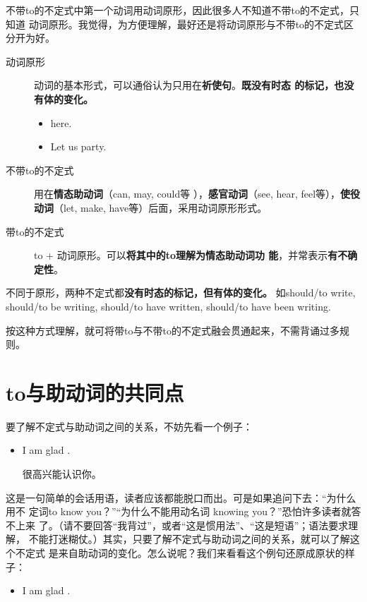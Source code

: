 不带to的不定式中第一个动词用动词原形，因此很多人不知道不带to的不定式，只知道
动词原形。我觉得，为方便理解，最好还是将动词原形与不带to的不定式区分开为好。

\begin{description}
\item[动词原形] 动词的基本形式，可以通俗认为只用在\textbf{祈使句}。\textbf{既没有时态
  的标记，也没有体的变化。}
  \begin{itemize}
  \item {} here.

  \item Let us party.
  \end{itemize}

\item[不带to的不定式] 用在\textbf{情态助动词}（can, may, could等
  ），\textbf{感官动词}（see, hear, feel等），\textbf{使役动词}（let, make,
  have等）后面，采用动词原形形式。

\item[带to的不定式] to + 动词原形。可以\textbf{将其中的to理解为情态助动词功
    能}，并常表示\textbf{有不确定性}。
\end{description}

不同于原形，两种不定式都\textbf{没有时态的标记，但有体的变化。} 如should/to write,
should/to be writing, should/to have written, should/to have been writing.

按这种方式理解，就可将带to与不带to的不定式融会贯通起来，不需背诵过多规则。

\section{to与助动词的共同点}

要了解不定式与助动词之间的关系，不妨先看一个例子：

\begin{itemize}
\item  I am glad .

  很高兴能认识你。
\end{itemize}

这是一句简单的会话用语，读者应该都能脱口而出。可是如果追问下去：“为什么用不
定词to know you？”“为什么不能用动名词 knowing you？”恐怕许多读者就答不上来
了。（请不要回答“我背过”，或者“这是惯用法”、“这是短语”；语法要求理解，
不能打迷糊仗。）其实，只要了解不定式与助动词之间的关系，就可以了解这个不定式
是来自助动词的变化。怎么说呢？我们来看看这个例句还原成原状的样子：

\begin{itemize}
\item  I am glad .
\end{itemize}

